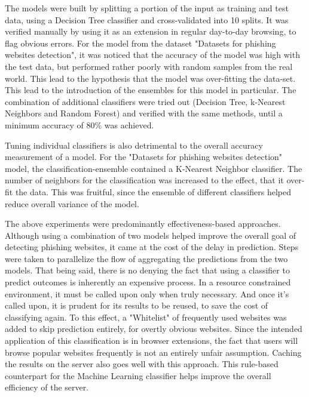 \documentclass[conference]{IEEEtran}
\begin{document}
\par The models were built by splitting a portion of the input as training and test data, using a Decision Tree classifier and cross-validated into 10 splits. It was verified manually by using it as an extension in regular day-to-day browsing, to flag obvious errors. For the model from the dataset "Datasets  for  phishing  websites  detection"\cite{GregaDataset}, it was noticed that the accuracy of the model was high with the test data, but performed rather poorly with random samples from the real world. This lead to the hypothesis that the model was over-fitting the data-set. This lead to the introduction of the ensembles for this model in particular. The combination of additional classifiers were tried out (Decision Tree, k-Nearest Neighbors and Random Forest) and verified with the same methods, until a minimum accuracy of 80\% was achieved.

\par Tuning individual classifiers is also detrimental to the overall accuracy measurement of a model. For the "Datasets  for  phishing  websites  detection"\cite{GregaDataset} model, the classification-ensemble contained a K-Nearest Neighbor classifier. The number of neighbors for the classification was increased to the effect, that it over-fit the data. This was fruitful, since the ensemble of different classifiers helped reduce overall variance of the model.

\par The above experiments were predominantly effectiveness-based approaches. Although using a combination of two models helped improve the overall goal of detecting phishing websites, it came at the cost of the delay in prediction. Steps were taken to parallelize the flow of aggregating the predictions from the two models. That being said, there is no denying the fact that using a classifier to predict outcomes is inherently an expensive process. In a resource constrained environment, it must be called upon only when truly necessary. And once it's called upon, it is prudent for its results to be reused, to save the cost of classifying again. To this effect, a "Whitelist" of frequently used websites was added to skip prediction entirely, for overtly obvious websites. Since the intended application of this classification is in browser extensions,  the fact that users will browse popular websites frequently is not an entirely unfair assumption. Caching the results on the server also goes well with this approach. This rule-based counterpart for the Machine Learning classifier helps improve the overall efficiency of the server.
\end{document}
